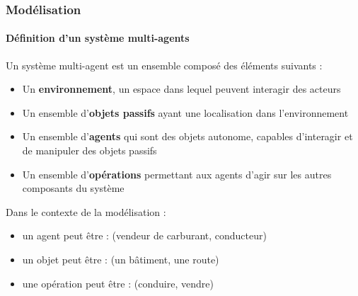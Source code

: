 \begin{frame}
    \frametitle{Modélisation}
    \framesubtitle{Définition d'un système multi-agents}
    Un système multi-agent est un ensemble composé des éléments suivants :
    \begin{itemize}
        \item Un \textbf{environnement}, un espace dans lequel peuvent interagir des acteurs
        \item Un ensemble d'\textbf{objets passifs} ayant une localisation dans l'environnement
        \item Un ensemble d'\textbf{agents} qui sont des objets autonome, capables d'interagir et de manipuler des objets passifs
        \item Un ensemble d'\textbf{opérations} permettant aux agents d'agir sur les autres composants du système
    \end{itemize}

    \pause{}

    Dans le contexte de la modélisation :
    \begin{itemize}
        \item un agent peut être : (vendeur de carburant, conducteur)
        \item un objet peut être : (un bâtiment, une route)
        \item une opération peut être : (conduire, vendre)
    \end{itemize}

\end{frame}

